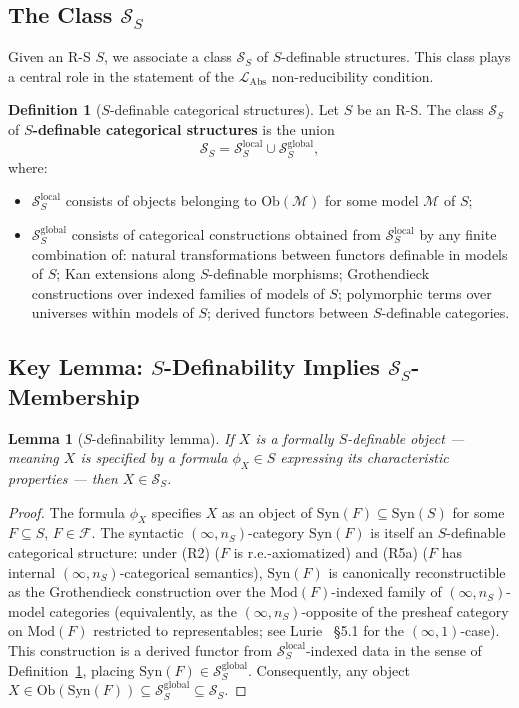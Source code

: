 \documentclass[11pt]{article}
\theoremstyle{plain}
\newtheorem{lemma}[theorem]{Lemma}
\theoremstyle{definition}
\newtheorem{definition}[theorem]{Definition}
\newcommand{\cS}{\mathcal{S}}
\newcommand{\cF}{\mathcal{F}}
\newcommand{\cM}{\mathcal{M}}
\newcommand{\LAbs}{\mathcal{L}_{\mathrm{Abs}}}
\newcommand{\Ob}{\mathrm{Ob}}
\newcommand{\Syn}{\mathrm{Syn}}
\newcommand{\Mod}{\mathrm{Mod}}
\begin{document}
\subsection{\texorpdfstring{The Class $\cS_S$}{The Class S\_S}}

Given an R-S $S$, we associate a class $\cS_S$ of $S$-definable structures. This class plays a central role in the statement of the $\LAbs$ non-reducibility condition.

\begin{definition}[$S$-definable categorical structures]\label{def:SS}
Let $S$ be an R-S. The class $\cS_S$ of \textbf{$S$-definable categorical structures} is the union
\[ \cS_S = \cS_S^{\mathrm{local}} \cup \cS_S^{\mathrm{global}}, \]
where:
\begin{itemize}
\item $\cS_S^{\mathrm{local}}$ consists of objects belonging to $\Ob(\cM)$ for some model $\cM$ of $S$;
\item $\cS_S^{\mathrm{global}}$ consists of categorical constructions obtained from $\cS_S^{\mathrm{local}}$ by any finite combination of: natural transformations between functors definable in models of $S$; Kan extensions along $S$-definable morphisms; Grothendieck constructions over indexed families of models of $S$; polymorphic terms over universes within models of $S$; derived functors between $S$-definable categories.
\end{itemize}
\end{definition}

\subsection{\texorpdfstring{Key Lemma: $S$-Definability Implies $\cS_S$-Membership}{Key Lemma: S-Definability Implies S\_S-Membership}}

\begin{lemma}[$S$-definability lemma]\label{lem:SS-membership}
If $X$ is a formally $S$-definable object --- meaning $X$ is specified by a formula $\phi_X \in S$ expressing its characteristic properties --- then $X \in \cS_S$.
\end{lemma}

\begin{proof}
The formula $\phi_X$ specifies $X$ as an object of $\Syn(F) \subseteq \Syn(S)$ for some $F \subseteq S$, $F \in \cF$. The syntactic $(\infty, n_S)$-category $\Syn(F)$ is itself an $S$-definable categorical structure: under (R2) ($F$ is r.e.-axiomatized) and (R5a) ($F$ has internal $(\infty, n_S)$-categorical semantics), $\Syn(F)$ is canonically reconstructible as the Grothendieck construction over the $\Mod(F)$-indexed family of $(\infty, n_S)$-model categories (equivalently, as the $(\infty, n_S)$-opposite of the presheaf category on $\Mod(F)$ restricted to representables; see Lurie~\cite{LurieHTT} \S 5.1 for the $(\infty, 1)$-case). This construction is a derived functor from $\cS_S^{\mathrm{local}}$-indexed data in the sense of Definition~\ref{def:SS}, placing $\Syn(F) \in \cS_S^{\mathrm{global}}$. Consequently, any object $X \in \Ob(\Syn(F)) \subseteq \cS_S^{\mathrm{global}} \subseteq \cS_S$.
\end{proof}
\end{document}
